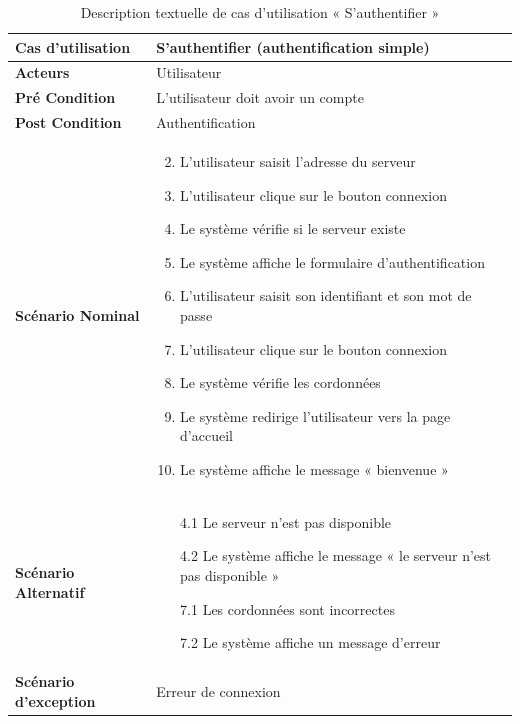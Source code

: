 \begin{longtable}{|p{5cm}|p{10cm}|}
  \caption{Description textuelle de cas d'utilisation « S'authentifier »} \label{tab:use_case_simple_authentification}\\
\hline
\textbf{Cas d'utilisation}&S'authentifier (authentification simple)\\
\hline
\textbf{Acteurs}&Utilisateur\\
\hline
\textbf{Pré Condition}&L'utilisateur doit avoir un compte\\
\hline
\textbf{Post Condition}&Authentification\\
\hline
\textbf{Scénario Nominal}&
\vspace{-\baselineskip}
\begin{enumerate}
    \setcounter{enumi}{1}
  \item L'utilisateur saisit l'adresse du serveur
  \item L'utilisateur clique sur le bouton connexion
  \item Le système vérifie si le serveur existe
  \item Le système affiche le formulaire d'authentification
  \item L'utilisateur saisit son identifiant et son mot de passe
  \item L'utilisateur clique sur le bouton connexion
  \item Le système vérifie les cordonnées
  \item Le système redirige l'utilisateur vers la page d'accueil
  \item Le système affiche le message « bienvenue »
\end{enumerate}\\
\hline
\textbf{Scénario Alternatif}&
\vspace{-\baselineskip}
\begin{enumerate}
      \item [4.1] Le serveur n'est pas disponible
      \item [4.2] Le système affiche le message « le serveur n'est pas disponible »
      \item [7.1] Les cordonnées sont incorrectes
      \item [7.2] Le système affiche un message d'erreur
\end{enumerate}\\
\hline
\textbf{Scénario d'exception}&Erreur de connexion\\
\hline

\end{longtable}

